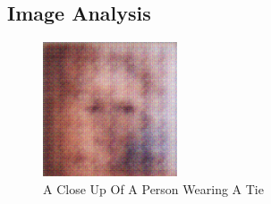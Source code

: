 \documentclass{article}%
\begin{document}
%
\subsection{Image Analysis}%
\label{subsec:ImageAnalysis}%


\begin{figure}[h!]%
\centering%
\includegraphics[width=150px]{500_fake_images/samples_5_30.png}%
\caption{A Close Up Of A Person Wearing A Tie}%
\end{figure}

%
\end{document}
